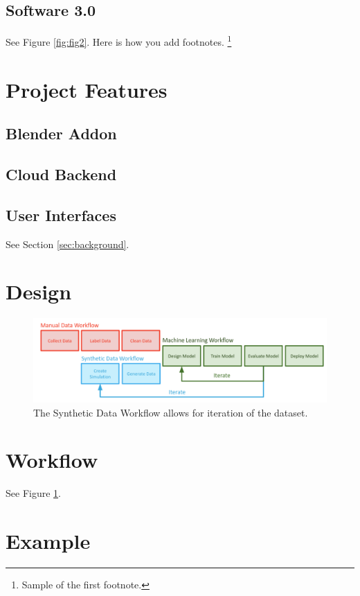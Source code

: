 \documentclass{article}
\begin{document}
\subsection{Software 3.0}
See Figure \ref{fig:fig2}. Here is how you add footnotes. \footnote{Sample of the first footnote.}
\lipsum[2]

\section{Project Features}
\label{sec:projectfeatures}

\subsection{Blender Addon}
\lipsum[2]

\subsection{Cloud Backend}
\lipsum[2]

\subsection{User Interfaces}
\lipsum[4] See Section \ref{sec:background}.

\section{Design}
\label{sec:design}

\begin{figure}
	\centering
	\includegraphics[width=\textwidth]{workflow.png}
	\caption{The Synthetic Data Workflow allows for iteration of the dataset.}
	\label{fig:fig3}
\end{figure}

\section{Workflow}
\label{sec:workflow}
See Figure \ref{fig:fig3}.

\section{Example}
\label{sec:example}
\end{document}
